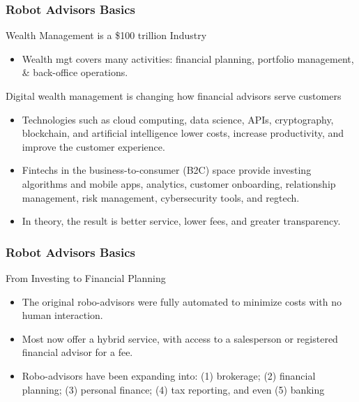 
\begin{frame}
\frametitle{Robot Advisors Basics}

\vspace{-2mm}
Wealth Management is a \$100 trillion Industry

\begin{itemize}
    \item Wealth mgt covers many activities: financial planning, portfolio management, \& back-office operations.
\end{itemize}

\smallskip 

Digital wealth management is changing how financial advisors serve customers


\begin{itemize}
    \item Technologies such as cloud computing, data science, APIs, cryptography, blockchain, and artificial intelligence lower costs, increase productivity, and improve the customer experience.

    \item Fintechs in the business-to-consumer (B2C) space provide investing algorithms and mobile apps, analytics, customer onboarding, relationship management, risk management, cybersecurity tools, and regtech.

    \item In theory, the result is better service, lower fees, and greater transparency.

\end{itemize}

\end{frame} 









\begin{frame}
\frametitle{Robot Advisors Basics}



\vspace{-2mm}
From Investing to Financial Planning
\begin{itemize}
  \item The original robo-advisors were fully automated to minimize costs with no human interaction.

  \item Most now offer a hybrid service, with access to a salesperson or registered financial advisor for a fee.

  \item Robo-advisors have been expanding into: (1) brokerage; (2) financial planning; (3) personal finance; (4) tax reporting, and even (5) banking
\end{itemize}




\end{frame} 




